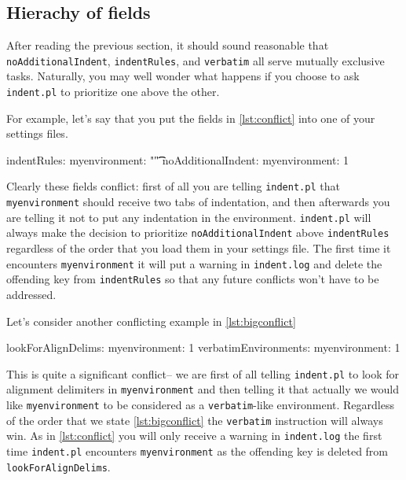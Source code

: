  \subsection{Hierachy of fields}\label{sec:fieldhierachy}
 	After reading the previous section, it should sound reasonable that 
 	\lstinline!noAdditionalIndent!, \lstinline!indentRules!, and 
 	\lstinline!verbatim! all serve mutually exclusive tasks. Naturally, you may 
 	well wonder what happens if you choose to ask \lstinline!indent.pl! to 
 	prioritize one above the other.
 	 	 	 	 	
 	For example, let's say that you put the fields in \cref{lst:conflict} into 
 	one of your settings files.  
 	\begin{yaml}[caption={Conflicting ideas},label={lst:conflict}]
indentRules:
   myenvironment: "\t\t"
noAdditionalIndent:
   myenvironment: 1
 	\end{yaml}
 	 	 	 	 	
 	Clearly these fields conflict: first of all 
 	you are telling \lstinline!indent.pl! that \lstinline!myenvironment! should 
 	receive two tabs of indentation, and then afterwards you are telling it 
 	not to put any indentation in the environment. \lstinline!indent.pl!
 	will always make the decision to prioritize \lstinline!noAdditionalIndent! above
 	\lstinline!indentRules! regardless of the order that you load them in 
 	your settings file. The first 
 	time it encounters \lstinline!myenvironment! it will put a warning in \lstinline!indent.log!
 	and delete the offending key from \lstinline!indentRules! so that any future 
 	conflicts won't have to be addressed.
 	 	 	 	 	
 	Let's consider another conflicting example in \cref{lst:bigconflict}
 	\begin{yaml}[caption={More conflicting ideas},label={lst:bigconflict}]
lookForAlignDelims:
   myenvironment: 1
verbatimEnvironments:
   myenvironment: 1
 	\end{yaml}
 	This is quite a significant conflict-- we are first of all telling \lstinline!indent.pl!
 	to look for alignment delimiters in \lstinline!myenvironment! and then 
 	telling it that actually we would like \lstinline!myenvironment! to be considered 
 	as a \lstinline!verbatim!-like environment. Regardless of the order that we 
 	state \cref{lst:bigconflict} the \lstinline!verbatim! instruction will always win.
 	As in \cref{lst:conflict} you will only receive a warning in \lstinline!indent.log! the 
 	first time \lstinline!indent.pl! encounters \lstinline!myenvironment! as the 
 	offending key is deleted from \lstinline!lookForAlignDelims!.
 	 	 	 	 	
